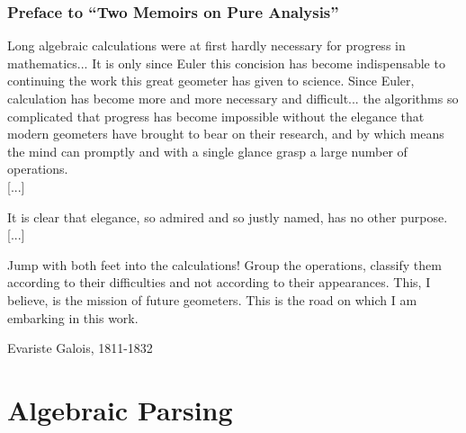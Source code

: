\documentclass{beamer}
\begin{document}
    \begin{frame}
        \frametitle{Preface to “Two Memoirs on Pure Analysis”}
        \setlength{\epigraphwidth}{\textwidth}
        \epigraph{Long algebraic calculations were at first hardly necessary for progress in mathematics... It is only since Euler this concision has become indispensable to continuing the work this great geometer has given to science. Since Euler, calculation has become more and more necessary and difficult... the algorithms so complicated that progress has become impossible without the elegance that modern geometers have brought to bear on their research, and by which means the mind can promptly and with a single glance grasp a large number of operations.\\

        [...]

        It is clear that elegance, so admired and so justly named, has no other purpose.\\

        [...]

        Jump with both feet into the calculations! Group the operations, classify them according to their difficulties and not according to their appearances. This, I believe, is the mission of future geometers. This is the road on which I am embarking in this work.}{Evariste Galois, 1811-1832}
    \end{frame}
    
    \section{Algebraic Parsing}\label{sec:algebraic-parsing}

\end{document}
